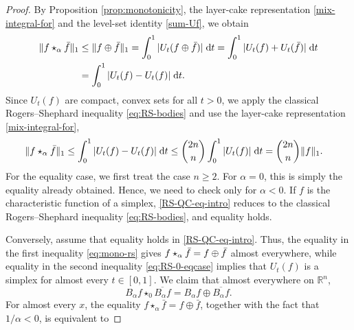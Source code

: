 \documentclass[11pt]{amsart}
\newcommand{\R}{{\mathbb R}}
\theoremstyle{plain}
\theoremstyle{definition}
\theoremstyle{remark}
\begin{document}
\begin{proof}
    By Proposition \ref{prop:monotonicity}, the layer-cake representation \eqref{mix-integral-for} and the level-set identity \eqref{sum-Uf}, we obtain
    \begin{align}
        \|f \star_{\alpha} \Bar{f}\|_1  &\leq
		\|f \oplus \Bar{f}\|_1 \label{eq:mono-rs}
        = \int_0^1 |U_t(f\oplus \Bar{f} ) | \;\mathrm dt
		= \int_0^1 |U_t(f) + U_t(\Bar{f})| \;\mathrm dt
        \\
        &= \int_0^1 |U_t(f) - U_t({f})| \;\mathrm dt.
	\end{align}
    Since $ U_t(f) $ are compact, convex sets for all $ t >0 $, we apply the classical Rogers--Shephard inequality \eqref{eq:RS-bodies} and use the layer-cake representation \eqref{mix-integral-for},
	\begin{align}
        \|f \star_{\alpha} \Bar{f}\|_1
		&\leq \int_0^1 |U_t(f) - U_t(f)| \;\mathrm dt
		\leq \binom{2n}{n} \int_0^1 |U_t(f)|\;\mathrm dt \label{eq:RS-0-eqcase}
		= \binom{2n}{n} \|f\|_1.
	\end{align}
    For the equality case, we first treat the case $n\geq 2$. For $\alpha=0$, this is simply the equality already obtained.  Hence, we need to check only for $\alpha <0$.
    If $f$ is the characteristic function of a simplex, \eqref{RS-QC-eq-intro} reduces to the classical Rogers--Shephard inequality \eqref{eq:RS-bodies}, and equality holds.

    Conversely, assume that equality holds in \eqref{RS-QC-eq-intro}.
    Thus, the equality in the first inequality \eqref{eq:mono-rs} gives $f \star_{\alpha} \Bar{f}  = f \oplus \Bar{f}$  almost everywhere, while equality in the second inequality \eqref{eq:RS-0-eqcase} implies that $U_t(f)$ is a simplex for almost every $t \in [0,1]$.
    We claim that almost everywhere on $\R^n$,
    \begin{equation}
        B_\alpha f \star_{0} \overline{B_\alpha f}  = B_\alpha f  \oplus \overline{B_\alpha f}. \label{eq:pt-Karamata-zero}
    \end{equation}
    For almost every $x$, the equality $f \star_\alpha \bar{f}=f \oplus \bar{f}$, together with the fact that $1 / \alpha<0$, is equivalent to


\end{proof}
\end{document}

